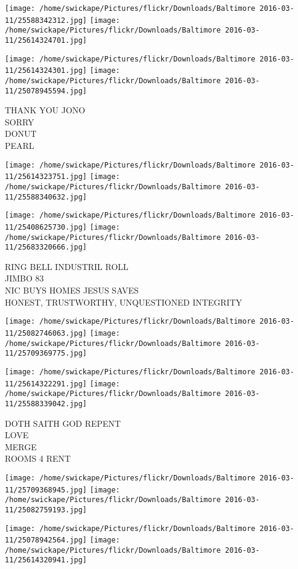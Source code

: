 \documentclass[10pt,letterpaper]{article}
\begin{document}
\texttt{[image: /home/swickape/Pictures/flickr/Downloads/Baltimore 2016-03-11/25588342312.jpg]}
\texttt{[image: /home/swickape/Pictures/flickr/Downloads/Baltimore 2016-03-11/25614324701.jpg]}

\texttt{[image: /home/swickape/Pictures/flickr/Downloads/Baltimore 2016-03-11/25614324301.jpg]}
\texttt{[image: /home/swickape/Pictures/flickr/Downloads/Baltimore 2016-03-11/25078945594.jpg]}

THANK YOU JONO\\
SORRY\\
DONUT\\
PEARL
\pagebreak

\texttt{[image: /home/swickape/Pictures/flickr/Downloads/Baltimore 2016-03-11/25614323751.jpg]}
\texttt{[image: /home/swickape/Pictures/flickr/Downloads/Baltimore 2016-03-11/25588340632.jpg]}

\texttt{[image: /home/swickape/Pictures/flickr/Downloads/Baltimore 2016-03-11/25408625730.jpg]}
\texttt{[image: /home/swickape/Pictures/flickr/Downloads/Baltimore 2016-03-11/25683320666.jpg]}

RING BELL INDUSTRIL ROLL\\
JIMBO 83\\
NIC BUYS HOMES JESUS SAVES\\
HONEST, TRUSTWORTHY, UNQUESTIONED INTEGRITY
\pagebreak

\texttt{[image: /home/swickape/Pictures/flickr/Downloads/Baltimore 2016-03-11/25082746063.jpg]}
\texttt{[image: /home/swickape/Pictures/flickr/Downloads/Baltimore 2016-03-11/25709369775.jpg]}

\texttt{[image: /home/swickape/Pictures/flickr/Downloads/Baltimore 2016-03-11/25614322291.jpg]}
\texttt{[image: /home/swickape/Pictures/flickr/Downloads/Baltimore 2016-03-11/25588339042.jpg]}

DOTH SAITH GOD REPENT\\
LOVE\\
MERGE\\
ROOMS 4 RENT
\pagebreak

\texttt{[image: /home/swickape/Pictures/flickr/Downloads/Baltimore 2016-03-11/25709368945.jpg]}
\texttt{[image: /home/swickape/Pictures/flickr/Downloads/Baltimore 2016-03-11/25082759193.jpg]}

\texttt{[image: /home/swickape/Pictures/flickr/Downloads/Baltimore 2016-03-11/25078942564.jpg]}
\texttt{[image: /home/swickape/Pictures/flickr/Downloads/Baltimore 2016-03-11/25614320941.jpg]}
\end{document}
